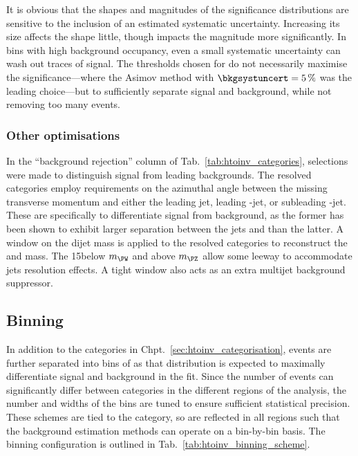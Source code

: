 It is obvious that the shapes and magnitudes of the significance distributions are sensitive to the inclusion of an estimated systematic uncertainty. Increasing its size affects the shape little, though impacts the magnitude more significantly. In bins with high background occupancy, even a small systematic uncertainty can wash out traces of signal. The thresholds chosen for \omegaTilde do not necessarily maximise the significance---where the Asimov method with $\bkgsystuncert = \text{5\,\%}$ was the leading choice---but to sufficiently separate signal and background, while not removing too many events.




\subsubsection{Other optimisations}
\label{subsubsec:htoinv_other_optimisations}

In the ``background rejection'' column of Tab.~\ref{tab:htoinv_categories}, selections were made to distinguish signal from leading backgrounds. The \ttH resolved categories employ requirements on the azimuthal angle between the missing transverse momentum and either the leading jet, leading \Pbottom-jet, or subleading \Pbottom-jet. These are specifically to differentiate \ttH signal from \ttbar background, as the former has been shown to exhibit larger separation between the \glspl{jet} and \ptmiss than the latter. A window on the dijet mass is applied to the \VH resolved categories to reconstruct the \PW and \PZ mass. The 15\GeV below $m_{\PW}$ and above $m_{\PZ}$ allow some leeway to accommodate \glspl{jet} resolution effects. A tight window also acts as an extra multijet background suppressor.




\subsection{Binning}
\label{subsec:htoinv_binning}

In addition to the categories in Chpt.~\ref{sec:htoinv_categorisation}, events are further separated into bins of \ptmiss as that distribution is expected to maximally differentiate signal and background in the fit. Since the number of events can significantly differ between categories in the different regions of the analysis, the number and widths of the bins are tuned to ensure sufficient statistical precision. These schemes are tied to the category, so are reflected in all regions such that the background estimation methods can operate on a bin-by-bin basis. The binning configuration is outlined in Tab.~\ref{tab:htoinv_binning_scheme}.

